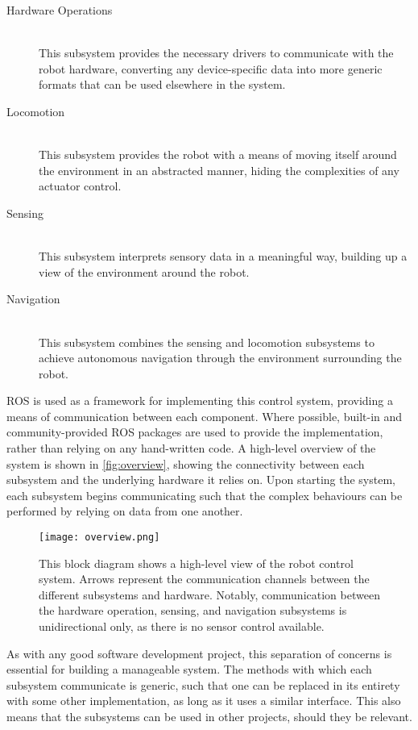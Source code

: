 \begin{description}
	\item[Hardware Operations] \hfill \\
	This subsystem provides the necessary drivers to communicate with the robot hardware, converting any device-specific data into more generic formats that can be used elsewhere in the system.

	\item[Locomotion] \hfill \\
	This subsystem provides the robot with a means of moving itself around the environment in an abstracted manner, hiding the complexities of any actuator control.

	\item[Sensing] \hfill \\
	This subsystem interprets sensory data in a meaningful way, building up a view of the environment around the robot.

	\item[Navigation] \hfill \\
	This subsystem combines the sensing and locomotion subsystems to achieve autonomous navigation through the environment surrounding the robot.
\end{description}

ROS is used as a framework for implementing this control system, providing a means of communication between each component. Where possible, built-in and community-provided ROS packages are used to provide the implementation, rather than relying on any hand-written code. A high-level overview of the system is shown in \autoref{fig:overview}, showing the connectivity between each subsystem and the underlying hardware it relies on. Upon starting the system, each subsystem begins communicating such that the complex behaviours can be performed by relying on data from one another.

\begin{figure}[h]
	\centering
	\texttt{[image: overview.png]}
	\caption{This block diagram shows a high-level view of the robot control system. Arrows represent the communication channels between the different subsystems and hardware. Notably, communication between the hardware operation, sensing, and navigation subsystems is unidirectional only, as there is no sensor control available.}
	\label{fig:overview}
\end{figure}

As with any good software development project, this separation of concerns is essential for building a manageable system. The methods with which each subsystem communicate is generic, such that one can be replaced in its entirety with some other implementation, as long as it uses a similar interface. This also means that the subsystems can be used in other projects, should they be relevant.

